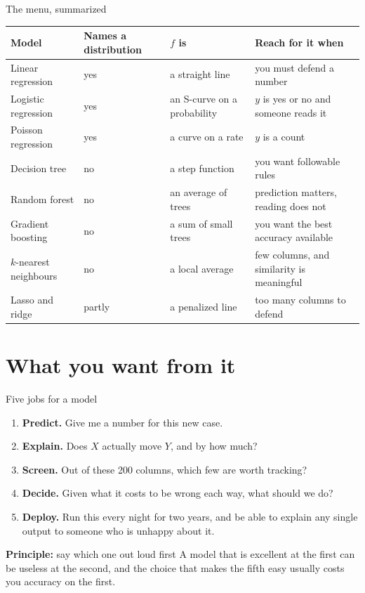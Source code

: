 \documentclass[aspectratio=169]{beamer}
\renewcommand{\arraystretch}{1.2}
\newenvironment{principle}[1]{\begin{block}{\textbf{Principle:} #1}}{\end{block}}
\begin{document}
\begin{frame}{The menu, summarized}
\begin{center}\footnotesize
\renewcommand{\arraystretch}{1.05}%
\begin{tabular}{L{0.22\textwidth} L{0.14\textwidth} L{0.23\textwidth} L{0.25\textwidth}}
\toprule
\textbf{Model} & \textbf{Names a distribution} & \textbf{$f$ is} & \textbf{Reach for it when} \\
\midrule
Linear regression & yes & a straight line & you must defend a number \\
Logistic regression & yes & an S-curve on a probability & $y$ is yes or no and someone reads it \\
Poisson regression & yes & a curve on a rate & $y$ is a count \\
Decision tree & no & a step function & you want followable rules \\
Random forest & no & an average of trees & prediction matters, reading does not \\
Gradient boosting & no & a sum of small trees & you want the best accuracy available \\
$k$-nearest neighbours & no & a local average & few columns, and similarity is meaningful \\
Lasso and ridge & partly & a penalized line & too many columns to defend \\
\bottomrule
\end{tabular}
\end{center}
\end{frame}

\section{What you want from it}
\begin{frame}{Five jobs for a model}
\begin{enumerate}
  \item \textbf{Predict.} Give me a number for this new case.
  \item \textbf{Explain.} Does $X$ actually move $Y$, and by how much?
  \item \textbf{Screen.} Out of these 200 columns, which few are worth tracking?
  \item \textbf{Decide.} Given what it costs to be wrong each way, what should we do?
  \item \textbf{Deploy.} Run this every night for two years, and be able to explain any single
        output to someone who is unhappy about it.
\end{enumerate}
\begin{principle}{say which one out loud first}
A model that is excellent at the first can be useless at the second, and the choice that makes
the fifth easy usually costs you accuracy on the first.
\end{principle}
\end{frame}
\end{document}
